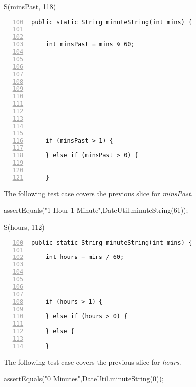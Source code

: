 \documentclass[fontsize=12pt,paper=letter,twoside]{scrartcl}
\begin{document}
S(minsPast, 118)
\begin{lstlisting}[numbers=left,firstnumber=100]
  public static String minuteString(int mins) {
    
    
    int minsPast = mins % 60;
    
    
    
    
    
     
    
     
    
     
    

    if (minsPast > 1) {
      
    } else if (minsPast > 0) {
      
    
    }
\end{lstlisting}
The following test case covers the previous slice for \emph{minsPast}.
\begin{code}
assertEquals("1 Hour 1 Minute",DateUtil.minuteString(61));
\end{code}

S(hours, 112)
\begin{lstlisting}[numbers=left,firstnumber=100]
  public static String minuteString(int mins) {
    
    int hours = mins / 60;
    
    
    
    
    
    if (hours > 1) {
      
    } else if (hours > 0) {
    
    } else {
    
    }
\end{lstlisting}
The following test case covers the previous slice for \emph{hours}.
\begin{code}
assertEquals("0 Minutes",DateUtil.minuteString(0));	
\end{code}
\end{document}
